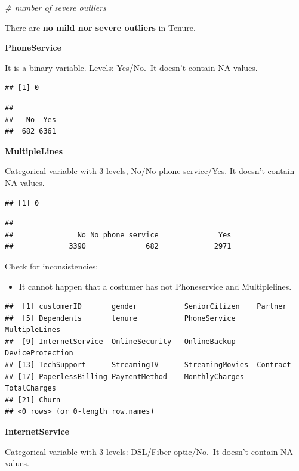 \documentclass[
  twoside]{article}
\newenvironment{Shaded}{\begin{snugshade}}{\end{snugshade}}
\newcommand{\CommentTok}[1]{\textcolor[rgb]{0.56,0.35,0.01}{\textit{#1}}}
\providecommand{\tightlist}{%
  \setlength{\itemsep}{0pt}\setlength{\parskip}{0pt}}
\begin{document}
\begin{Shaded}
\begin{Highlighting}[]
\CommentTok{\# number of severe outliers}
\end{Highlighting}
\end{Shaded}

There are \textbf{no mild nor severe outliers} in Tenure.

\textbf{PhoneService}

It is a binary variable. Levels: Yes/No.~It doesn't contain NA values.

\begin{verbatim}
## [1] 0
\end{verbatim}

\begin{verbatim}
## 
##   No  Yes 
##  682 6361
\end{verbatim}

\textbf{MultipleLines}

Categorical variable with 3 levels, No/No phone service/Yes. It doesn't
contain NA values.

\begin{verbatim}
## [1] 0
\end{verbatim}

\begin{verbatim}
## 
##               No No phone service              Yes 
##             3390              682             2971
\end{verbatim}

Check for inconsistencies:

\begin{itemize}
\tightlist
\item
  It cannot happen that a costumer has not Phoneservice and
  Multiplelines.
\end{itemize}

\begin{verbatim}
##  [1] customerID       gender           SeniorCitizen    Partner         
##  [5] Dependents       tenure           PhoneService     MultipleLines   
##  [9] InternetService  OnlineSecurity   OnlineBackup     DeviceProtection
## [13] TechSupport      StreamingTV      StreamingMovies  Contract        
## [17] PaperlessBilling PaymentMethod    MonthlyCharges   TotalCharges    
## [21] Churn           
## <0 rows> (or 0-length row.names)
\end{verbatim}

\textbf{InternetService}

Categorical variable with 3 levels: DSL/Fiber optic/No.~It doesn't
contain NA values.
\end{document}

